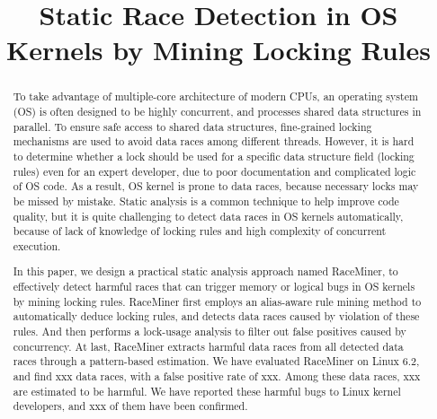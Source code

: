 \documentclass[pageno]{jpaper}
\begin{document}
\title{
Static Race Detection in OS Kernels by Mining Locking Rules}

\date{}
\maketitle

\thispagestyle{empty}

\begin{abstract}
	
To take advantage of multiple-core architecture of modern CPUs, an operating 
system (OS) is often designed to be highly concurrent, and processes shared 
data structures in parallel. To ensure safe access to shared data structures, 
fine-grained locking mechanisms are used to avoid data races among different 
threads. However, it is hard to determine whether a lock should be used for a 
specific data structure field (locking rules) even for an expert developer, due 
to poor documentation and complicated logic of OS code. As a result, OS kernel 
is prone to data races, because necessary locks may be missed by mistake. 
Static analysis is a common technique to help improve code quality, but it is 
quite challenging to detect data races in OS kernels automatically, because of 
lack of knowledge of locking rules and high complexity of concurrent execution.

In this paper, we design a practical static analysis approach named RaceMiner, 
to effectively detect harmful races that can trigger memory or logical bugs in 
OS kernels by mining locking rules. RaceMiner first employs an alias-aware rule 
mining method to automatically deduce locking rules, and detects data races 
caused by violation of these rules. And then performs a lock-usage analysis to 
filter out false positives caused by concurrency. At last, RaceMiner extracts 
harmful data races from all detected data races through a pattern-based 
estimation. We have evaluated RaceMiner on Linux 6.2, and find xxx data races, 
with a false positive rate of xxx. Among these data races, xxx are estimated to 
be harmful. We have reported these harmful bugs to Linux kernel developers, and 
xxx of them have been confirmed.

\end{abstract}










\footnotesize


\end{document}
